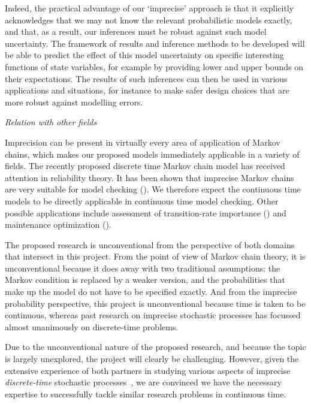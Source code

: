 \documentclass[11pt,dvipsnames,usenames,a4paper]{article}
\begin{document}
Indeed, the practical advantage of our `imprecise' approach is that it explicitly acknowledges that we may not know the relevant probabilistic models exactly, and that, as a result, our inferences must be robust against such model uncertainty. 
The framework of results and inference methods to be developed will be able to predict the effect of this model uncertainty on specific interesting functions of state variables, for example by providing lower and upper bounds on their expectations. 
The results of such inferences can then be used in various applications and situations, for instance to make safer design choices that are more robust against modelling errors.

\emph{Relation with other fields}

Imprecision can be present in virtually every area of application of Markov chains, which makes our proposed models immediately applicable in a variety of fields. The recently proposed discrete time Markov chain model has received attention in reliability theory. It has been shown that imprecise Markov chains are very suitable for model checking (\cite{troffaes:2013}). We therefore expect the continuous time models to be directly applicable in continuous time model checking. Other possible applications include assessment of transition-rate importance (\cite{ramirez2015assessment}) and maintenance optimization (\cite{baraldi2013maintenance, compare2015genetic}). 

The proposed research is unconventional from the perspective of both domains that intersect in this project.
From the point of view of Markov chain theory, it is unconventional because it does away with two traditional assumptions: the Markov condition is replaced by a weaker version, and the probabilities that make up the model do not have to be specified exactly. 
And from the imprecise probability perspective, this project is unconventional because time is taken to be continuous, whereas past research on imprecise stochastic processes has focussed almost unanimously on discrete-time problems.

Due to the unconventional nature of the proposed research, and because the topic is largely unexplored, the project will clearly be challenging. 
However, given the extensive experience of both partners in studying various aspects of imprecise \emph{discrete-time} stochastic processes~\cite{cooman2007d,cooman2008,hermans2012,cooman2015:markovergodic}, we are convinced we have the necessary expertise to successfully tackle similar research problems in continuous time.
\end{document}
